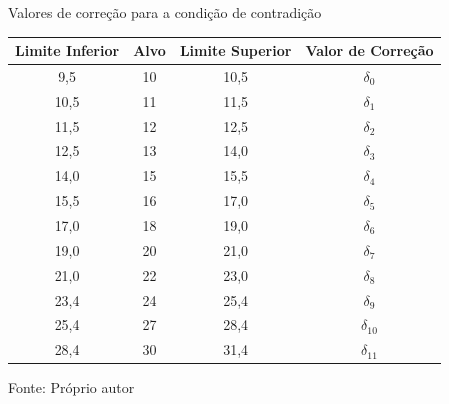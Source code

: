 \begin{frame}{Valores de correção para a condição de contradição}

\begin{table}[h]
\centering
\label{tab:correcaoDelta}

\begin{tabular}{c|c|c||c}
\hline
Limite Inferior & Alvo & Limite Superior & Valor de Correção\\ \hline
\hline
 9,5 & 10 & 10,5 & $\delta_0$ \\ \hline
10,5 & 11 & 11,5 & $\delta_1$ \\ \hline
11,5 & 12 & 12,5 & $\delta_2$ \\ \hline
12,5 & 13 & 14,0 & $\delta_3$ \\ \hline
14,0 & 15 & 15,5 & $\delta_4$ \\ \hline
15,5 & 16 & 17,0 & $\delta_5$ \\ \hline
17,0 & 18 & 19,0 & $\delta_6$ \\ \hline
19,0 & 20 & 21,0 & $\delta_7$ \\ \hline
21,0 & 22 & 23,0 & $\delta_8$ \\ \hline
23,4 & 24 & 25,4 & $\delta_9$ \\ \hline
25,4 & 27 & 28,4 & $\delta_{10}$ \\ \hline
28,4 & 30 & 31,4 & $\delta_{11}$ \\ \hline

\end{tabular}
{\vspace{-0.2cm} \small Fonte: Próprio autor}
\end{table}

\end{frame}
